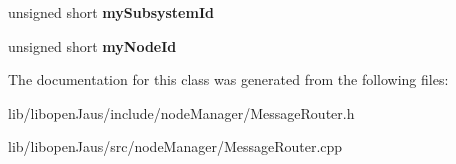 \begin{DoxyCompactItemize}
\item 
\hypertarget{class_message_router_a7923f8b35be07720db38c9e86f5f47e3}{unsigned short {\bfseries my\-Subsystem\-Id}}\label{class_message_router_a7923f8b35be07720db38c9e86f5f47e3}

\item 
\hypertarget{class_message_router_a8774741f6f3338112f138583ded664cd}{unsigned short {\bfseries my\-Node\-Id}}\label{class_message_router_a8774741f6f3338112f138583ded664cd}

\end{DoxyCompactItemize}


\-The documentation for this class was generated from the following files\-:\begin{DoxyCompactItemize}
\item 
lib/libopen\-Jaus/include/node\-Manager/\-Message\-Router.\-h\item 
lib/libopen\-Jaus/src/node\-Manager/\-Message\-Router.\-cpp\end{DoxyCompactItemize}
